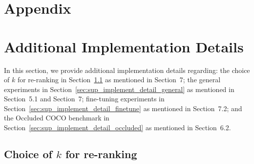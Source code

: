 

\onecolumn


\appendix
\section*{Appendix}

\section{Additional Implementation Details}
\label{sec:sup_implement_detail}

In this section, we provide additional implementation details regarding: the choice of $k$ for re-ranking in Section~\ref{sec:supple_choice_of_k} as mentioned in Section~7; the general experiments in Section~\ref{sec:sup_implement_detail_general} as mentioned in Section~5.1 and Section~7; fine-tuning experiments in Section~\ref{sec:sup_implement_detail_finetune} as mentioned in Section~7.2; and the Occluded COCO benchmark in Section~\ref{sec:sup_implement_detail_occluded} as mentioned in Section~6.2.


\subsection{Choice of $k$ for re-ranking}
\label{sec:supple_choice_of_k}


